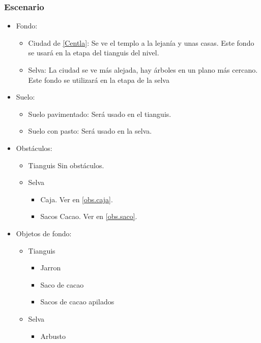 \documentclass[11pt,letterpaper]{article}
\begin{document}
\subsubsection{Escenario}
\begin{itemize} 
	\item Fondo:
\begin{itemize}
			\item Ciudad de \ref{Centla}: Se ve el templo a la lejanía y unas casas. Este fondo se usará en la etapa del tianguis del nivel.
			\item Selva: La ciudad se ve más alejada, hay árboles en un plano más cercano. Este fondo se utilizará en la etapa de la selva  
\end{itemize}	
	\item Suelo:
		\begin{itemize}
			\item Suelo pavimentado: Será usado en el tianguis.
			\item Suelo con pasto: Será usado en la selva.
		\end{itemize}
	\item Obstáculos:
		\begin{itemize}
			\item Tianguis
				Sin obstáculos.
			\item Selva
				\begin{itemize}
					\item Caja. Ver en \ref{obs.caja}.
					\item Sacos Cacao. Ver en \ref{obs.saco}.
				\end{itemize}
		\end{itemize}
	\item Objetos de fondo:
		\begin{itemize}
			\item Tianguis
				\begin{itemize}
					\item Jarron
					\item Saco de cacao
					\item Sacos de cacao apilados
				\end{itemize}
			\item Selva
				\begin{itemize}
					\item Arbusto
				\end{itemize}

		\end{itemize}
\end{itemize}	
\end{document}
